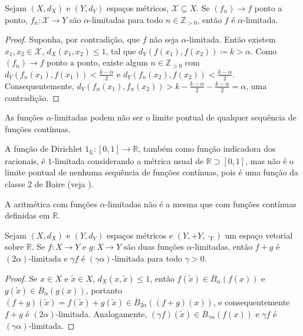 \begin{theorem}
  Sejam $(X, d_X)$ e $(Y, d_Y)$ espaços métricos, $\mathcal{X} \subseteq X$. Se $(f_n) \to f$ ponto a ponto, $f_n : \mathcal{X} \to Y$ são $\alpha$-limitadas para todo $n \in \mathbb{Z}_{> 0}$, então $f$ é $\alpha$-limitada.
\end{theorem}
\begin{proof}
  Suponha, por contradição, que $f$ não seja $\alpha$-limitada. Então existem $x_1, x_2 \in \mathcal{X}$, $d_X(x_1, x_2) \le 1$, tal que $d_Y(f(x_1), f(x_2)) \coloneqq k > \alpha$. Como $(f_n) \to f$ ponto a ponto, existe algum $n \in \mathbb{Z}_{> 0}$ com $d_Y(f_n(x_1), f(x_1)) < \frac{k - \alpha}{2}$ e $d_Y(f_n(x_2), f(x_2)) < \frac{k - \alpha}{2}$. Consequentemente, $d_Y(f_n(x_1), f_n(x_2)) > k - \frac{k - \alpha}{2} - \frac{k - \alpha}{2} = \alpha$, uma contradição.
\end{proof}

As funções $\alpha$-limitadas podem não ser o limite pontual de qualquer sequência de funções contínuas.

\begin{example}
  A função de Dirichlet $1_\mathbb{Q} : [0, 1] \to \mathbb{R}$, também como função indicadora dos racionais, é $1$-limitada considerando a métrica usual de $\mathbb{R} \supset [0, 1]$, mas não é o limite pontual de nenhuma sequência de funções contínuas, pois é uma função da classe 2 de Baire (veja \cite{baire}).
\end{example}

A aritmética com funções $\alpha$-limitadas não é a mesma que com funções contínuas definidas em $\mathbb{R}$.

\begin{theorem}
  Sejam $(X, d_X)$ e $(Y, d_Y)$ espaços métricos e $(Y, +Y, \cdot_Y)$ um espaço vetorial sobre $\mathbb{R}$. Se $f : X \to Y$ e $g : X \to Y$ são duas funções $\alpha$-limitadas, então $f + g$ é $(2\alpha)$-limitada e $\gamma f$ é $(\gamma \alpha)$-limitada para todo $\gamma > 0$.
\end{theorem}
\begin{proof}
  Se $x \in X$ e $\tilde{x} \in X$, $d_X(x, \tilde{x}) \le 1$, então $f(\tilde{x}) \in \overline{B}_{\alpha}(f(x))$ e $g(\tilde{x}) \in \overline{B}_{\alpha}(g(x))$, portanto $(f + g)(\tilde{x}) = f(\tilde{x}) + g(\tilde{x}) \in \overline{B}_{2\alpha}((f + g)(x))$, e consequentemente $f + g$ é $(2\alpha)$-limitada. Analogamente, $(\gamma f)(\tilde{x}) \in \overline{B}_{\gamma \alpha}(f(x))$ e $\gamma f$ é $(\gamma \alpha)$-limitada.
\end{proof}

